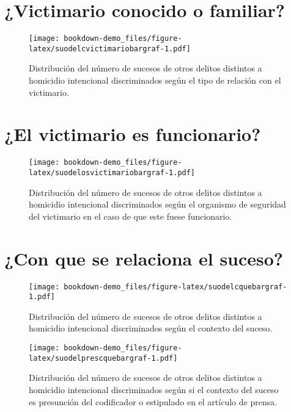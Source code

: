 \documentclass[
]{book}
\begin{document}
\hypertarget{victimario-conocido-o-familiar}{%
\section{¿Victimario conocido o familiar?}\label{victimario-conocido-o-familiar}}



\begin{figure}
\centering
\texttt{[image: bookdown-demo\_files/figure-latex/suodelcvictimariobargraf-1.pdf]}
\caption{\label{fig:suodelcvictimariobargraf}Distribución del número de sucesos de otros delitos distintos a homicidio intencional discriminados según el tipo de relación con el victimario.}
\end{figure}

\hypertarget{el-victimario-es-funcionario}{%
\section{¿El victimario es funcionario?}\label{el-victimario-es-funcionario}}



\begin{figure}
\centering
\texttt{[image: bookdown-demo\_files/figure-latex/suodelosvictimariobargraf-1.pdf]}
\caption{\label{fig:suodelosvictimariobargraf}Distribución del número de sucesos de otros delitos distintos a homicidio intencional discriminados según el organismo de seguridad del victimario en el caso de que este fuese funcionario.}
\end{figure}

\hypertarget{con-que-se-relaciona-el-suceso}{%
\section{¿Con que se relaciona el suceso?}\label{con-que-se-relaciona-el-suceso}}



\begin{figure}
\centering
\texttt{[image: bookdown-demo\_files/figure-latex/suodelcquebargraf-1.pdf]}
\caption{\label{fig:suodelcquebargraf}Distribución del número de sucesos de otros delitos distintos a homicidio intencional discriminados según el contexto del suceso.}
\end{figure}



\begin{figure}
\centering
\texttt{[image: bookdown-demo\_files/figure-latex/suodelprescquebargraf-1.pdf]}
\caption{\label{fig:suodelprescquebargraf}Distribución del número de sucesos de otros delitos distintos a homicidio intencional discriminados según si el contexto del suceso es presunción del codificador o estipulado en el artículo de prensa.}
\end{figure}
\end{document}
